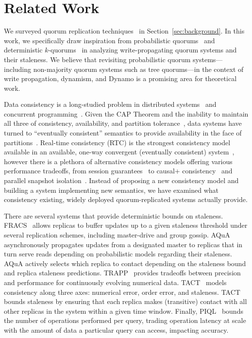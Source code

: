 \documentclass{vldb}
\newcommand{\sectionskip}{-0em}
\begin{document}
\vspace{\sectionskip}\section{Related Work}
\label{sec:relatedwork}

We surveyed quorum replication
techniques~\cite{prob-quorum-dynamic, treequorum,non-strict,
  multi-k-quorum, quorums-start, quorum-placement, partitionedquorum, quorums-alternative, prob-quorum,
  quorum-overview, quorumsystems} in Section~\ref{sec:background}.  In
this work, we specifically draw inspiration from probabilistic
quorums~\cite{prob-quorum} and deterministic
$k$-quorums~\cite{multi-k-quorum, non-strict} in analyzing
write-propagating quorum systems and their staleness.  We believe that
revisiting probabilistic quorum systems---including non-majority
quorum systems such as tree quorums---in the context of write
propagation, dynamism, and Dynamo is a promising area for theoretical
work.

Data consistency is a long-studied problem in distributed
systems~\cite{consistency-partitioned, danger-rep} and concurrent
programming~\cite{linearizability}.  Given the CAP Theorem and the
inability to maintain all three of consistency, availability, and
partition tolerance~\cite{cap-proof}, data systems have turned to
``eventually consistent'' semantics to provide availability in the
face of partitions~\cite{consistency-partitioning, vogels-defs}.
Real-time consistency (RTC) is the strongest consistency model
available in an available, one-way convergent (eventually consistent)
system~\cite{rtc-proof}, however there is a plethora of alternative
consistency models offering various performance tradeoffs, from
session guarantees~\cite{sessionguarantees} to causal+
consistency~\cite{cops} and parallel snapshot isolation~\cite{walter}.
Instead of proposing a new consistency model and building a system
implementing new semantics, we have examined what consistency
existing, widely deployed quorum-replicated systems actually provide.

There are several systems that provide deterministic bounds on
staleness.  FRACS~\cite{frac} allows replicas to buffer updates up to
a given staleness threshold under several replication schemes,
including master-drive and group gossip.  AQuA~\cite{aqua}
asynchronously propagates updates from a designated master to replicas
that in turn serve reads depending on probabilistic models regarding
their staleness.  AQuA actively selects which replica to contact
depending on the staleness bound and replica staleness predictions.
TRAPP~\cite{trapp} provides tradeoffs between precision and
performance for continuously evolving numerical data.
TACT~\cite{vahdat-article, vahdat-bounded} models consistency along
three axes: numerical error, order error, and staleness.  TACT bounds
staleness by ensuring that each replica makes (transitive) contact
with all other replicas in the system within a given time window.
Finally, PIQL~\cite{piql} bounds the number of operations performed
per query, trading operation latency at scale with the amount of data
a particular query can access, impacting accuracy.
\end{document}
